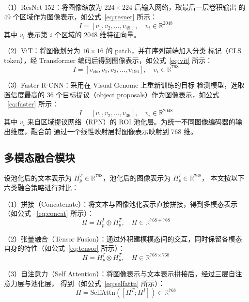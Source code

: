 \documentclass[12pt]{ctexart}
\begin{document}
（1）ResNet-152\cite{he2016}：将图像缩放为 $224\times224$ 后输入网络，取最后一层卷积输出
的 49 个区域作为图像表示，如公式~\eqref{eq:resnet} 所示：
\begin{equation}
  I=[v_1,v_2,\ldots,v_{49}],\quad v_i\in\mathbb{R}^{2048}
  \label{eq:resnet}
\end{equation}
其中 $v_i$ 表示第 $i$ 个区域的 2048 维特征向量。

（2）ViT\cite{dosovitskiy2021}：将图像划分为 $16\times16$ 的 patch，并在序列前端加入分类
标记（CLS token），经 Transformer\cite{vaswani2017} 编码后得到图像表示，如公式~\eqref{eq:vit}
所示：
\begin{equation}
  I=[v_{\mathrm{cls}},v_1,v_2,\ldots,v_{196}],\quad v_i\in\mathbb{R}^{768}
  \label{eq:vit}
\end{equation}

（3）Faster R-CNN\cite{ren2015}：采用在 Visual Genome\cite{krishna2017} 上重新训练的目标
检测模型，选取置信度最高的 36 个目标提议（object proposals）作为图像表示，如公式
~\eqref{eq:faster} 所示：
\begin{equation}
  I=[v_1,v_2,\ldots,v_{36}],\quad v_i\in\mathbb{R}^{2048}
  \label{eq:faster}
\end{equation}
其中 $v_i$ 来自区域提议网络（RPN）的 ROI 池化层。为统一不同图像编码器的输出维度，融合前
通过一个线性映射层将图像表示映射到 768 维\cite{ye2023}。

\subsection{多模态融合模块}
设池化后的文本表示为 $H_p^T\in\mathbb{R}^{768}$，池化后的图像表示为 $H_p^I\in\mathbb{R}^{768}$，
本文按以下六类融合策略进行对比\cite{ye2023}：

（1）拼接（Concatenate）：将文本与图像池化表示直接拼接，得到多模态表示（如公式
~\eqref{eq:concat} 所示）：
\begin{equation}
  H=H_p^I\oplus H_p^T,\quad H\in\mathbb{R}^{768+768}
  \label{eq:concat}
\end{equation}

（2）张量融合（Tensor Fusion）\cite{zadeh2017}：通过外积建模模态间的交互，同时保留各模态
自身的特性（如公式~\eqref{eq:tensor} 所示）：
\begin{equation}
  H=H_p^I\otimes H_p^T,\quad H\in\mathbb{R}^{768\times768}
  \label{eq:tensor}
\end{equation}

（3）自注意力（Self Attention）：将图像表示与文本表示拼接后，经过三层自注意力层与池化层，
得到（如公式~\eqref{eq:selfattn} 所示）：
\begin{equation}
  H=\mathrm{SelfAttn}([H^T;H^I])\in\mathbb{R}^{768}
  \label{eq:selfattn}
\end{equation}
\end{document}
